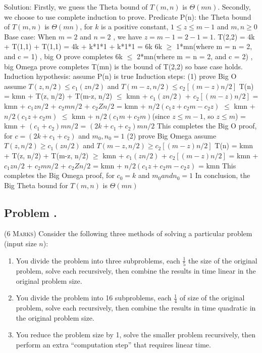 \documentclass[12pt]{article}
\newcounter{ProblemNum}
\renewcommand{\theProblemNum}{\arabic{ProblemNum}}
\newcommand*{\anyproblem}[1]{\newpage\subsection*{#1}}
\newcommand*{\problem}[1]{\stepcounter{ProblemNum} %
\anyproblem{Problem \theProblemNum. \; #1}}
\begin{document}
Solution:\vskip5pt
Firstly, we guess the Theta bound of $T(m,n)$ is $\Theta(mn)$.\vskip5pt 
Secondly, we choose to use complete induction to prove.\vskip5pt
Predicate P(n): the Theta bound of $T(m,n)$ is $ \Theta(mn)$, for $k$ is a positive constant, $1 \le z \le m-1$ and $m,n \ge 0$ \vskip5pt
Base case: When $m = 2$ and $n = 2$ , we have $z = m -1 = 2 -1 = 1$.\vskip5pt 
T(2,2) = 4k + T(1,1) + T(1,1)\vskip5pt
\qquad = 4k + k*1*1 + k*1*1  = 6k \vskip5pt 
6k $\ge$ 1*mn(where m = n = 2, and c = 1) , big O prove completes\vskip5pt
6k $\le$ 2*mn(where m = n = 2, and c = 2) , big Omega prove completes\vskip5pt
T(mn) is the bound of T(2,2) so base case holds.
\vskip5pt 
Induction hypothesis: assume P(n) is true\vskip5pt
Induction steps: \vskip5pt 
(1) prove Big O\vskip5pt
assume $T(z, n/2) \le c_1(zn/2)$ and $T(m - z, n/2) \le c_2[(m - z)n/2]$ \vskip5pt
T(n) = kmn + T(z, n/2) + T(m-z, n/2)\vskip5pt 
\qquad $\le$ kmn + $c_1(zn/2)$ + $c_2[(m - z)n/2]$\vskip5pt
\qquad = kmn + $c_1zn/2$ + $c_2mn/2$ + $c_2Zn/2$\vskip5pt
\qquad = kmn + $n/2(c_1z +c_2m - c_2z)$\vskip5pt 
\qquad $\le$ kmn + $n/2(c_1z + c_2m)$\vskip5pt
\qquad $\le$ kmn + $n/2(c_1m + c_2m)$(since $z\le m -1$, so $z \le m$)\vskip5pt
\qquad = kmn + $(c_1 + c_2)mn/2$\vskip5pt
\qquad = $(2k+c_1+c_2)mn/2$\vskip5pt
This completes the Big O proof, for $c = (2k+c_1+c_2)$ and $m_0,n_0 = 1$\vskip5pt 
(2) prove Big Omega\vskip5pt 
assume $T(z, n/2) \ge c_1(zn/2)$ and $T(m - z, n/2) \ge c_2[(m - z)n/2]$ \vskip5pt
T(n) = kmn + T(z, n/2) + T(m-z, n/2)\vskip5pt 
\qquad $\ge$ kmn + $c_1(zn/2)$ + $c_2[(m - z)n/2]$\vskip5pt
\qquad = kmn + $c_1zn/2$ + $c_2mn/2$ + $c_2Zn/2$\vskip5pt
\qquad = kmn + $n/2(c_1z +c_2m - c_2z)$\vskip5pt 
\qquad = kmn \vskip5pt
This completes the Big Omega proof, for $c_0 =k$ and $m_0 and n_0 = 1$\vskip5pt
In conclusion, the Big Theta bound for $T(m,n)$ is $\Theta(mn)$


\problem{}
\textsc{(6 Marks)} Consider the following three methods of solving a particular problem (input size $n$):
\begin{enumerate}
	\item
	You divide the problem into three subproblems, each $\frac{1}{5}$ the size of the original problem, solve each recursively, then combine the results in time linear in the original problem size.
	
	\item
	You divide the problem into 16 subproblems, each $\frac{1}{4}$ of size of the original problem, solve each recursively, then combine the results in time quadratic in the original problem size.
	
	\item
	You reduce the problem size by 1, solve the smaller problem recursively, then perform an extra ``computation step'' that requires linear time. 
\end{enumerate}
\end{document}
